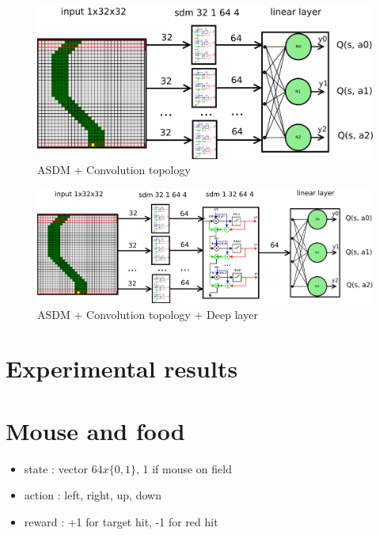 \documentclass[10pt,a4paper]{article}
\begin{document}
\begin{figure}[!htb]
  \centering
  \includegraphics[scale=0.18]{../diagrams/convolution_02.png}
  \caption{ASDM + Convolution topology}
  \label{img:ASDM + Convolution topology}
\end{figure}

\begin{figure}[!htb]
  \centering
  \includegraphics[scale=0.18]{../diagrams/convolution_03.png}
  \caption{ASDM + Convolution topology + Deep layer}
  \label{img:ASDM + Convolution topology + Deep layer}
\end{figure}




\newpage
\section{Experimental results}

\section{Mouse and food}

\begin{itemize}
  \item state : vector $64x\{0, 1\}$, 1 if mouse on field
  \item action : left, right, up, down
  \item reward : +1 for target hit, -1 for red hit
\end{itemize}
\end{document}
